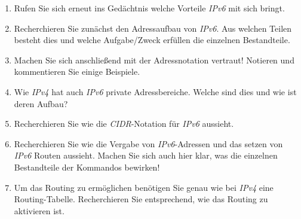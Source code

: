 \documentclass[paper=a4,fontsize=11pt]{scrartcl}%
\numberwithin{equation}{section}
\begin{document}
\begin{enumerate}
	\item Rufen Sie sich erneut ins Gedächtnis welche Vorteile \emph{IPv6} mit sich bringt.
	\item Recherchieren Sie zunächst den Adressaufbau von \emph{IPv6}. Aus welchen Teilen besteht dies und welche Aufgabe/Zweck erfüllen die einzelnen Bestandteile.
	\item Machen Sie sich anschließend mit der Adressnotation vertraut! Notieren und kommentieren Sie einige Beispiele.
	\item Wie \emph{IPv4} hat auch \emph{IPv6} private Adressbereiche. Welche sind dies und wie ist deren Aufbau?
	\item Recherchieren Sie wie die \emph{CIDR}-Notation für \emph{IPv6} aussieht.
	\item Recherchieren Sie wie die Vergabe von \emph{IPv6}-Adressen und das setzen von \emph{IPv6} Routen aussieht. Machen Sie sich auch hier klar, was die einzelnen Bestandteile der Kommandos bewirken!
	\item Um das Routing zu ermöglichen benötigen Sie genau wie bei \emph{IPv4} eine Routing-Tabelle. Recherchieren Sie entsprechend, wie das Routing zu aktivieren ist.
\end{enumerate}
\end{document}
